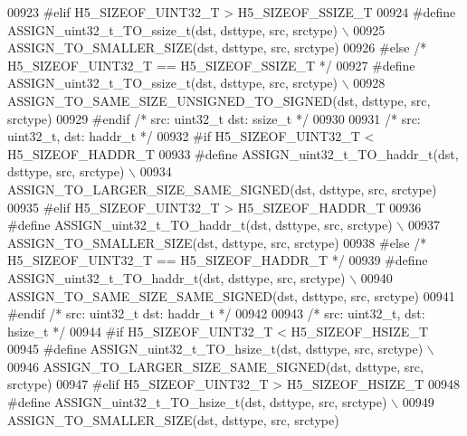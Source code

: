 \begin{DoxyCode}
00923 \textcolor{preprocessor}{#elif H5\_SIZEOF\_UINT32\_T > H5\_SIZEOF\_SSIZE\_T}
00924 \textcolor{preprocessor}{    #define ASSIGN\_uint32\_t\_TO\_ssize\_t(dst, dsttype, src, srctype) \(\backslash\)}
00925 \textcolor{preprocessor}{        ASSIGN\_TO\_SMALLER\_SIZE(dst, dsttype, src, srctype)}
00926 \textcolor{preprocessor}{#else }\textcolor{comment}{/* H5\_SIZEOF\_UINT32\_T == H5\_SIZEOF\_SSIZE\_T */}\textcolor{preprocessor}{}
00927 \textcolor{preprocessor}{    #define ASSIGN\_uint32\_t\_TO\_ssize\_t(dst, dsttype, src, srctype) \(\backslash\)}
00928 \textcolor{preprocessor}{        ASSIGN\_TO\_SAME\_SIZE\_UNSIGNED\_TO\_SIGNED(dst, dsttype, src, srctype)}
00929 \textcolor{preprocessor}{#endif }\textcolor{comment}{/* src: uint32\_t dst: ssize\_t */}\textcolor{preprocessor}{}
00930 
00931 \textcolor{comment}{/* src: uint32\_t, dst: haddr\_t */}
00932 \textcolor{preprocessor}{#if H5\_SIZEOF\_UINT32\_T < H5\_SIZEOF\_HADDR\_T}
00933 \textcolor{preprocessor}{    #define ASSIGN\_uint32\_t\_TO\_haddr\_t(dst, dsttype, src, srctype) \(\backslash\)}
00934 \textcolor{preprocessor}{        ASSIGN\_TO\_LARGER\_SIZE\_SAME\_SIGNED(dst, dsttype, src, srctype)}
00935 \textcolor{preprocessor}{#elif H5\_SIZEOF\_UINT32\_T > H5\_SIZEOF\_HADDR\_T}
00936 \textcolor{preprocessor}{    #define ASSIGN\_uint32\_t\_TO\_haddr\_t(dst, dsttype, src, srctype) \(\backslash\)}
00937 \textcolor{preprocessor}{        ASSIGN\_TO\_SMALLER\_SIZE(dst, dsttype, src, srctype)}
00938 \textcolor{preprocessor}{#else }\textcolor{comment}{/* H5\_SIZEOF\_UINT32\_T == H5\_SIZEOF\_HADDR\_T */}\textcolor{preprocessor}{}
00939 \textcolor{preprocessor}{    #define ASSIGN\_uint32\_t\_TO\_haddr\_t(dst, dsttype, src, srctype) \(\backslash\)}
00940 \textcolor{preprocessor}{        ASSIGN\_TO\_SAME\_SIZE\_SAME\_SIGNED(dst, dsttype, src, srctype)}
00941 \textcolor{preprocessor}{#endif }\textcolor{comment}{/* src: uint32\_t dst: haddr\_t */}\textcolor{preprocessor}{}
00942 
00943 \textcolor{comment}{/* src: uint32\_t, dst: hsize\_t */}
00944 \textcolor{preprocessor}{#if H5\_SIZEOF\_UINT32\_T < H5\_SIZEOF\_HSIZE\_T}
00945 \textcolor{preprocessor}{    #define ASSIGN\_uint32\_t\_TO\_hsize\_t(dst, dsttype, src, srctype) \(\backslash\)}
00946 \textcolor{preprocessor}{        ASSIGN\_TO\_LARGER\_SIZE\_SAME\_SIGNED(dst, dsttype, src, srctype)}
00947 \textcolor{preprocessor}{#elif H5\_SIZEOF\_UINT32\_T > H5\_SIZEOF\_HSIZE\_T}
00948 \textcolor{preprocessor}{    #define ASSIGN\_uint32\_t\_TO\_hsize\_t(dst, dsttype, src, srctype) \(\backslash\)}
00949 \textcolor{preprocessor}{        ASSIGN\_TO\_SMALLER\_SIZE(dst, dsttype, src, srctype)}

\end{DoxyCode}
